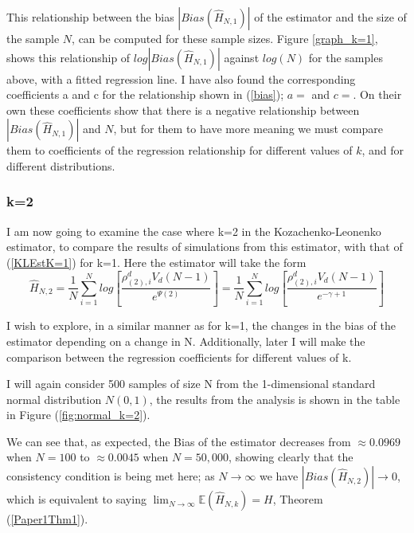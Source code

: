 \documentclass{article}
\begin{document}
This relationship between the bias $|Bias(\hat{H}_{N, 1})|$ of the estimator and the size of the sample $N$, can be computed for these sample sizes. Figure \ref{graph_k=1}, shows this relationship of $log|Bias(\hat{H}_{N, 1})|$ against $log(N)$ for the samples above, with a fitted regression line. I have also found the corresponding coefficients a and c for the relationship shown in (\ref{bias}); $a = $ and $c = $. On their own these coefficients show that there is a negative relationship between $|Bias(\hat{H}_{N, 1})|$ and $N$, but for them to have more meaning we must compare them to coefficients of the regression relationship for different values of $k$, and for different distributions.

\subsubsection{k=2}

I am now going to examine the case where k=2 in the Kozachenko-Leonenko estimator, to compare the results of simulations from this estimator, with that of (\ref{KLEstK=1}) for k=1. Here the estimator will take the form
\begin{equation}
\hat{H}_{N, 2} = \frac{1}{N} \sum_{i=1}^{N} log \left[ \frac{\rho_{(2),i}^{d} V_{d} (N-1)}{e^{\Psi(2)}} \right] = \frac{1}{N} \sum_{i=1}^{N} log \left[ \frac{\rho_{(2),i}^{d} V_{d} (N-1)}{e^{-\gamma + 1}} \right]
\end{equation}

I wish to explore, in a similar manner as for k=1, the changes in the bias of the estimator depending on a change in N. Additionally, later I will make the comparison between the regression coefficients for different values of k.

I will again consider 500 samples of size N from the 1-dimensional standard normal distribution $N(0, 1)$, the results from the analysis is shown in the table in Figure (\ref{fig:normal_k=2}).

We can see that, as expected, the Bias of the estimator decreases from $\approx 0.0969$ when $N=100$ to $\approx 0.0045$ when $N=50,000$, showing clearly that the consistency condition is being met here; as $N \to \infty$ we have $|Bias(\hat{H}_{N, 2})| \to 0$, which is equivalent to saying $\lim_{N \to \infty} \mathbb{E} (\hat{H}_{N, k}) = H$, Theorem (\ref{Paper1Thm1}).
\end{document}
